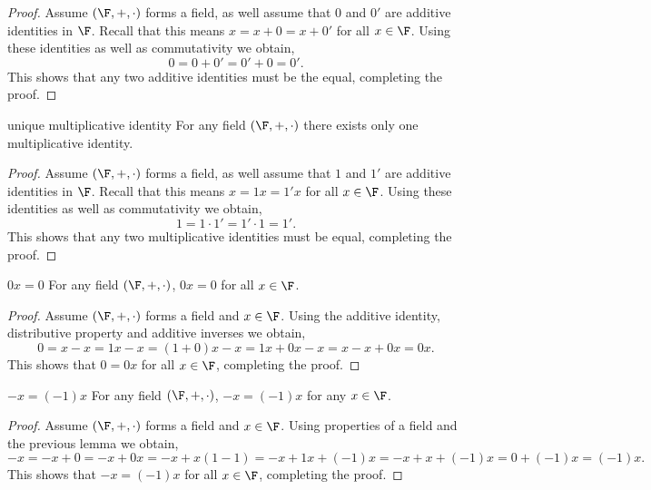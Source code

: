 \documentclass{report}
\begin{document}
\begin{proof}
  Assume $\left(\F, +, \cdot\right)$ forms a field, as well assume that $0$ and $0'$ are additive identities in $\F$.
  Recall that this means $x = x + 0 = x + 0'$ for all $x \in \F$.
  Using these identities as well as commutativity we obtain,
  $$0 = 0 + 0' = 0' + 0 = 0'.$$
  This shows that any two additive identities must be the equal, completing the proof.
\end{proof}

\begin{lemma}{unique multiplicative identity}{}
  For any field $\left(\F, +, \cdot\right)$ there exists only one multiplicative identity.
\end{lemma}

\begin{proof}
  Assume $\left(\F, +, \cdot\right)$ forms a field, as well assume that $1$ and $1'$ are additive identities in $\F$.
  Recall that this means $x = 1x =  1'x$ for all $x \in \F$.
  Using these identities as well as commutativity we obtain,
  $$1 = 1 \cdot 1' = 1' \cdot 1 = 1'.$$
  This shows that any two multiplicative identities must be equal, completing the proof.
\end{proof}

\begin{lemma}{$0x = 0$}{}
  For any field $\left(\F, +, \cdot\right)$, $0x = 0$ for all $x \in \F$.
\end{lemma}

\begin{proof}
  Assume $\left(\F, +, \cdot\right)$ forms a field and $x \in \F$.
  Using the additive identity, distributive property and additive inverses we obtain,
  $$0 = x - x = 1x - x = (1 + 0)x - x = 1x + 0x - x = x - x + 0x = 0x.$$
  This shows that $0 = 0x$ for all $x \in \F$, completing the proof.
\end{proof}

\begin{lemma}{$-x = (-1)x$}{}
  For any field $\left(\F, +, \cdot\right)$, $-x = (-1)x$ for any $x \in \F$.
\end{lemma}

\begin{proof}
  Assume $\left(\F, +, \cdot\right)$ forms a field and $x \in \F$.
  Using properties of a field and the previous lemma we obtain,
  $$-x = -x + 0 = -x + 0x = -x + x(1 - 1) = -x + 1x + (-1)x = -x + x + (-1)x = 0 + (-1)x = (-1)x.$$
  This shows that $-x = (-1)x$ for all $x \in \F$, completing the proof.
\end{proof}
\end{document}
